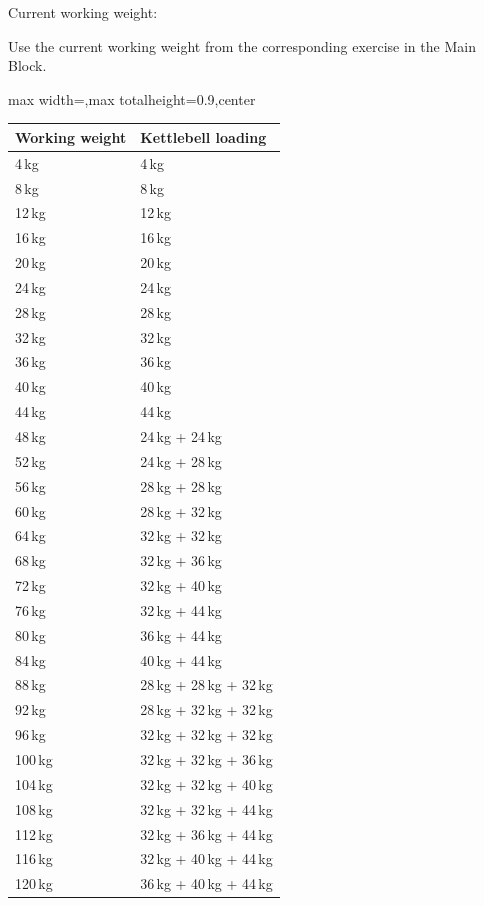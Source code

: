 \documentclass[11pt,a4paper]{article}
\newcommand{\tablearraystretch}{1.15}
\begin{document}
Current working weight:

Use the current working weight from the corresponding exercise in the Main Block.

\begin{center}
\renewcommand{\arraystretch}{\tablearraystretch}
\begin{adjustbox}{max width=\linewidth,max totalheight=0.9\textheight,center}
\begin{tabular}{ll}
\toprule
Working weight & Kettlebell loading \\
\midrule
4\,kg & 4\,kg \\
8\,kg & 8\,kg \\
12\,kg & 12\,kg \\
16\,kg & 16\,kg \\
20\,kg & 20\,kg \\
24\,kg & 24\,kg \\
28\,kg & 28\,kg \\
32\,kg & 32\,kg \\
36\,kg & 36\,kg \\
40\,kg & 40\,kg \\
44\,kg & 44\,kg \\
48\,kg & 24\,kg + 24\,kg \\
52\,kg & 24\,kg + 28\,kg \\
56\,kg & 28\,kg + 28\,kg \\
60\,kg & 28\,kg + 32\,kg \\
64\,kg & 32\,kg + 32\,kg \\
68\,kg & 32\,kg + 36\,kg \\
72\,kg & 32\,kg + 40\,kg \\
76\,kg & 32\,kg + 44\,kg \\
80\,kg & 36\,kg + 44\,kg \\
84\,kg & 40\,kg + 44\,kg \\
88\,kg & 28\,kg + 28\,kg + 32\,kg \\
92\,kg & 28\,kg + 32\,kg + 32\,kg \\
96\,kg & 32\,kg + 32\,kg + 32\,kg \\
100\,kg & 32\,kg + 32\,kg + 36\,kg \\
104\,kg & 32\,kg + 32\,kg + 40\,kg \\
108\,kg & 32\,kg + 32\,kg + 44\,kg \\
112\,kg & 32\,kg + 36\,kg + 44\,kg \\
116\,kg & 32\,kg + 40\,kg + 44\,kg \\
120\,kg & 36\,kg + 40\,kg + 44\,kg \\
\bottomrule
\end{tabular}
\end{adjustbox}
\renewcommand{\arraystretch}{1}
\end{center}
\end{document}
